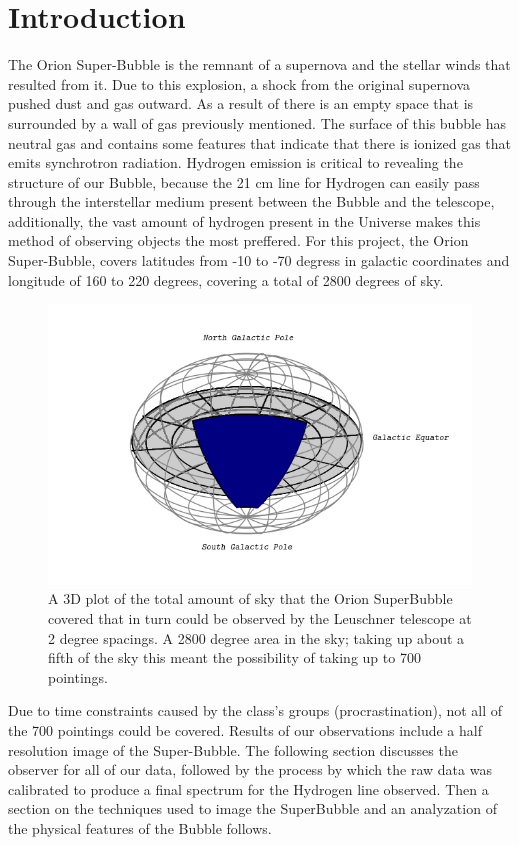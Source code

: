 \documentclass[12 pt]{article}
\begin{document}
\section*{Introduction}
The Orion Super-Bubble is the remnant of a supernova and the stellar
winds that resulted from it. Due to this explosion, a shock
from the original supernova pushed dust and gas outward. As a
result of there is an empty space that is surrounded by a wall of gas previously
mentioned. The surface of this bubble has neutral gas and contains some
features that indicate that there is ionized gas that emits
synchrotron radiation.  Hydrogen emission is critical to revealing the
structure of our Bubble, because the 21 cm line for Hydrogen can easily
pass through the interstellar medium present between the Bubble and the
telescope, additionally, the vast amount of hydrogen present in the
Universe makes this method of observing objects the most preffered. For this project, the Orion
Super-Bubble, covers latitudes from -10 to -70 degress in galactic
coordinates and longitude of 160 to 220 degrees, covering a total of
2800 degrees of sky.
\begin{figure}[H]
\centering
\includegraphics[scale=0.75]{cooords.png}
\caption{A 3D plot of the total amount of sky that the Orion SuperBubble
  covered that in turn could be observed
  by the Leuschner telescope at 2 degree spacings. A 2800 degree area in the sky; taking up
  about a fifth of the sky this meant the possibility of taking up to
  700 pointings. }
\label{galaccooords}
\end{figure}
 Due to time constraints caused by the class's groups
(procrastination), not all of the 700 pointings could be covered. Results of our observations
include a half resolution image of the Super-Bubble. The following section discusses the
observer for all of our data, followed by the process by which the raw
data was calibrated to produce a final spectrum for the Hydrogen line
observed. Then a section on the techniques used to image the SuperBubble
and an analyzation of the physical features of the Bubble follows.   
\end{document}
